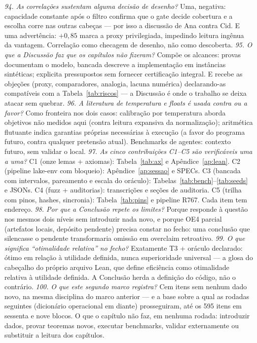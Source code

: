 \textit{94. As correlações sustentam alguma decisão de desenho?} Uma, negativa: capacidade constante após o filtro confirma que o gate decide cobertura e a escolha corre nas outras cabeças --- por isso a discussão de Ana contra Cid. E uma advertência: $+0{,}85$ marca a proxy privilegiada, impedindo leitura ingênua da vantagem. Correlação como checagem de desenho, não como descoberta.
\textit{95. O que a Discussão faz que os capítulos não fizeram?} Compõe os alcances: provas documentam o modelo, bancada descreve a implementação em instâncias sintéticas; explicita pressupostos sem fornecer certificação integral. E recebe as objeções (proxy, comparadores, analogia, lacuna numérica) declarando-as compatíveis com a Tabela~\ref{tab:riscos} --- a Discussão é onde o trabalho se deixa atacar sem quebrar.
\textit{96. A literatura de temperatura e floats é usada contra ou a favor?} Como fronteira nos dois casos: calibração por temperatura aborda objetivos não medidos aqui (contra leitura expansiva da normalização); aritmética flutuante indica garantias próprias necessárias à execução (a favor do programa futuro, contra qualquer pretensão atual). Benchmarks de agentes: contexto futuro, sem validar o local.
\textit{97. As cinco contribuições C1--C5 são verificáveis uma a uma?} C1 (onze lemas + axiomas): Tabela~\ref{tab:ax} e Apêndice~\ref{ap:lean}. C2 (pipeline lake-env com bloqueio): Apêndice~\ref{ap:sessao} e SPECs. C3 (bancada com intervalos, pareamento e escala do oráculo): Tabelas~\ref{tab:bench}--\ref{tab:seeds} e JSONs. C4 (fuzz + auditorias): transcrições e seções de auditoria. C5 (trilha com pinos, hashes, sincronia): Tabela~\ref{tab:pins} e pipeline R767. Cada item tem endereço.
\textit{98. Por que a Conclusão repete os limites?} Porque responde à questão nos mesmos dois níveis sem introduzir nada novo, e porque OE4 parcial (artefatos locais, depósito pendente) precisa constar no fecho: uma conclusão que silencasse o pendente transformaria omissão em overclaim retroativo.
\textit{99. O que significa ``otimalidade relativa'' no fecho?} Exatamente T3 + oráculo declarado: ótimo em relação à utilidade definida, nunca superioridade universal --- a glosa do cabeçalho do próprio arquivo Lean, que define eficiência como otimalidade relativa à utilidade definida. A Conclusão herda a definição do código, não o contrário.
\textit{100. O que este segundo marco registra?} Cem itens sem nenhum dado novo, na mesma disciplina do marco anterior --- e a base sobre a qual as rodadas seguintes (dicionário operacional em diante) prosseguiram, até os 595 itens em sessenta e nove blocos. O que o capítulo não faz, em nenhuma rodada: introduzir dados, provar teoremas novos, executar benchmarks, validar externamente ou substituir a leitura dos capítulos.
